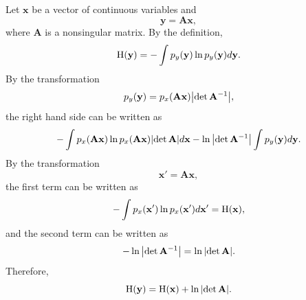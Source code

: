 \subsection{}
\label{1.32}
Let $\mathbf{x}$ be a vector of continuous variables and 
%
\begin{equation}
\mathbf{y} 
= 
\mathbf{A} 
\mathbf{x},
\end{equation}
%
where $\mathbf{A}$ is a nonsingular matrix.
By the definition, 
%
\begin{equation}
{\rm H}(\mathbf{y}) 
= 
- 
\int 
p_y(\mathbf{y}) 
\ln p_y(\mathbf{y}) 
d\mathbf{y}.
\end{equation}
%
By the transformation
%
\begin{equation}
p_y(\mathbf{y}) 
= 
p_x(\mathbf{A} \mathbf{x}) 
\abs{\det \mathbf{A} ^ {-1}},
\end{equation}
%
the right hand side can be written as
%
\begin{equation}
- 
\int 
p_x(\mathbf{A} \mathbf{x}) 
\ln p_x(\mathbf{A} \mathbf{x}) 
\abs{\det \mathbf{A}} 
d\mathbf{x} 
- 
\ln \abs{\det \mathbf{A} ^ {-1}} 
\int 
p_y(\mathbf{y}) 
d\mathbf{y}.
\end{equation}
%
By the transformation 
%
\begin{equation}
\mathbf{x}' 
= 
\mathbf{A} 
\mathbf{x},
\end{equation}
%
the first term can be written as
%
\begin{equation}
- 
\int 
p_x(\mathbf{x}') 
\ln p_x(\mathbf{x}') 
d\mathbf{x}' 
= 
{\rm H}(\mathbf{x}),
\end{equation}
%
and the second term can be written as
%
\begin{equation}
- 
\ln 
\abs{\det \mathbf{A} ^ {-1}} 
= \ln \abs{\det \mathbf{A}}.
\end{equation}
%
Therefore,
%
\begin{equation}
{\rm H}(\mathbf{y}) 
= 
{\rm H}(\mathbf{x}) 
+ 
\ln \abs{\det \mathbf{A}}.
\end{equation}
%


